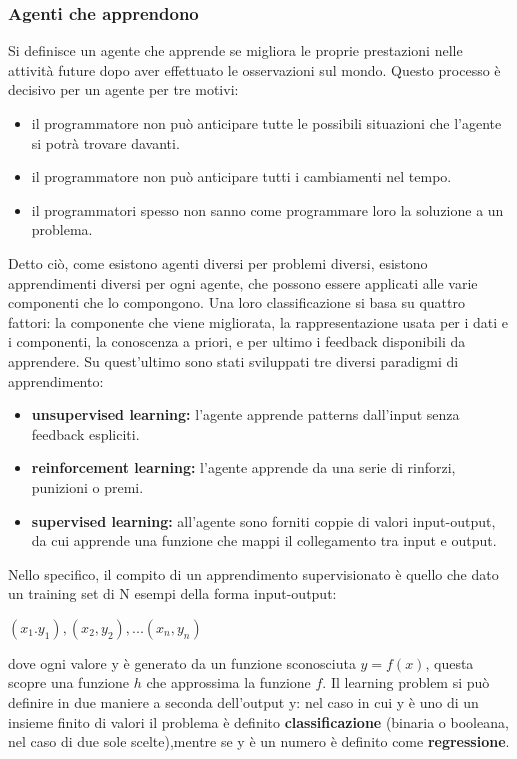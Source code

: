 \documentclass[14pt]{extarticle}
\begin{document}
\subsubsection{Agenti che apprendono}
Si definisce un agente che apprende se migliora le proprie prestazioni nelle attività future dopo aver effettuato le osservazioni
sul mondo. \cite{russell2005intelligenza}
Questo processo è decisivo per un agente per tre motivi:
\begin{itemize}
\item il programmatore non può anticipare tutte le possibili situazioni che l'agente si potrà trovare davanti.
\item il programmatore non può anticipare tutti i cambiamenti nel tempo.
\item il programmatori spesso non sanno come programmare loro la soluzione a un problema.
\end{itemize}\cite{russell2005intelligenza}

Detto ciò, come esistono agenti diversi per problemi diversi, esistono apprendimenti diversi per ogni agente, che possono essere applicati alle varie componenti che  lo compongono.
Una loro classificazione si basa su quattro fattori: la componente che viene migliorata, la rappresentazione usata per i dati e i componenti, la conoscenza a priori, e per ultimo i feedback disponibili da apprendere. Su quest'ultimo sono stati sviluppati tre diversi paradigmi di apprendimento:
\begin{itemize}
\item \textbf{unsupervised learning:} l'agente apprende patterns dall'input senza feedback espliciti. 
\item \textbf{reinforcement learning:} l'agente apprende da una serie di rinforzi, punizioni o premi.
\item \textbf{supervised learning:} all'agente sono forniti coppie di valori input-output, da cui apprende una funzione che mappi il collegamento tra input e output. 
\end{itemize}
Nello specifico, il compito di un apprendimento supervisionato è quello che dato un training set di N esempi della forma input-output:
\begin{center}
$(x_{1}.y_{1}),(x_{2},y_{2}),...(x_{n},y_{n})$
\end{center}
dove ogni valore y è generato da un funzione sconosciuta $y=f(x)$, questa scopre una funzione $h$ che approssima la funzione $f$.  
Il learning problem si può definire in due maniere a seconda dell'output y: nel caso in cui  y è uno di  un insieme finito di valori il problema è definito  \textbf{classificazione} (binaria o booleana, nel caso di due sole scelte),mentre se y è un numero 
 è definito come \textbf{regressione}.
 
\end{document}
